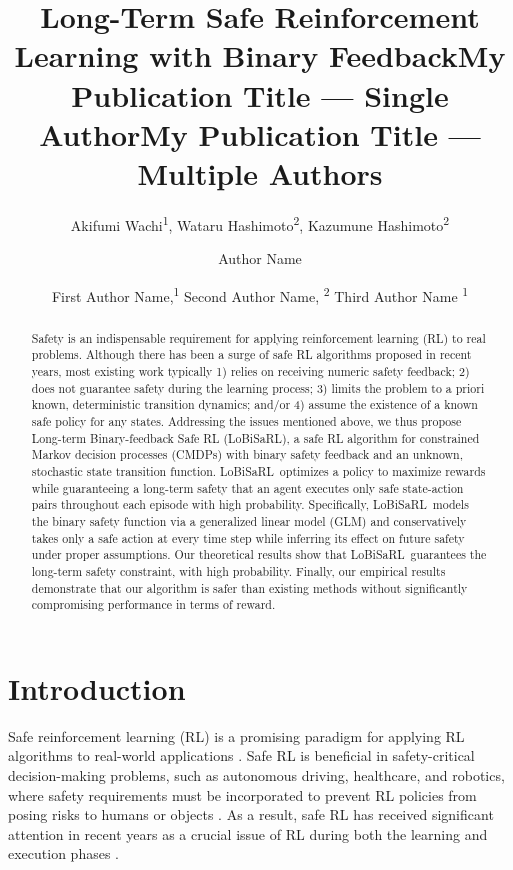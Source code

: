\documentclass[letterpaper]{article} %
\title{Long-Term Safe Reinforcement Learning with Binary Feedback}
\author {
    Akifumi Wachi\textsuperscript{\rm 1},
    Wataru Hashimoto\textsuperscript{\rm 2},
    Kazumune Hashimoto\textsuperscript{\rm 2}
}
\title{My Publication Title --- Single Author}
\author {
    Author Name
}
\title{My Publication Title --- Multiple Authors}
\author {
    First Author Name,\textsuperscript{\rm 1}
    Second Author Name, \textsuperscript{\rm 2}
    Third Author Name \textsuperscript{\rm 1}
}
\newcommand{\algo}{\textsf{LoBiSaRL}}
\begin{document}
\maketitle

\begin{abstract}
Safety is an indispensable requirement for applying reinforcement learning (RL) to real problems.
Although there has been a surge of safe RL algorithms proposed in recent years, most existing work typically 1) relies on receiving numeric safety feedback; 2) does not guarantee safety during the learning process; 3) limits the problem to a priori known, deterministic transition dynamics; and/or 4) assume the existence of a known safe policy for any states.
Addressing the issues mentioned above, we thus propose Long-term Binary-feedback Safe RL (\algo), a safe RL algorithm for constrained Markov decision processes (CMDPs) with binary safety feedback and an unknown, stochastic state transition function.
\algo~optimizes a policy to maximize rewards while guaranteeing a long-term safety that an agent executes only safe state-action pairs throughout each episode with high probability.
Specifically, \algo~models the binary safety function via a generalized linear model (GLM) and conservatively takes only a safe action at every time step while inferring its effect on future safety under proper assumptions.
Our theoretical results show that \algo~guarantees the long-term safety constraint, with high probability.
Finally, our empirical results demonstrate that our algorithm is safer than existing methods without significantly compromising performance in terms of reward.
\end{abstract}

\section{Introduction}
\label{sec:introduction}

Safe reinforcement learning (RL) is a promising paradigm for applying RL algorithms to real-world applications \cite{garcia2015comprehensive}.
Safe RL is beneficial in safety-critical decision-making problems, such as autonomous driving, healthcare, and robotics, where safety requirements must be incorporated to prevent RL policies from posing risks to humans or objects \cite{dulac2021challenges}.
As a result, safe RL has received significant attention in recent years as a crucial issue of RL during both the learning and execution phases \cite{amodei2016concrete}.
\end{document}
